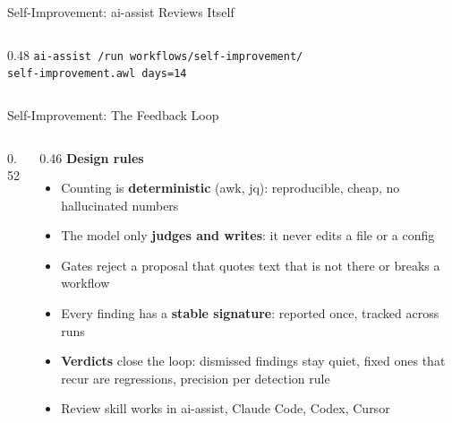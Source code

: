 \documentclass[aspectratio=169,10pt]{beamer}
\begin{document}
\begin{frame}[fragile]{Self-Improvement: ai-assist Reviews Itself}
\begin{columns}[T]
\begin{column}{0.48\textwidth}
\smallskip
{\scriptsize\texttt{ai-assist /run workflows/self-improvement/\\self-improvement.awl days=14}}
\end{column}
\end{columns}
\end{frame}

\begin{frame}[fragile]{Self-Improvement: The Feedback Loop}
\begin{columns}[T]
\begin{column}{0.52\textwidth}
\centering
{}
\end{column}
\begin{column}{0.46\textwidth}
\textbf{Design rules}
\begin{itemize}\scriptsize\setlength{\itemsep}{1pt}
  \item Counting is \textbf{deterministic} (awk, jq): reproducible, cheap, no hallucinated numbers
  \item The model only \textbf{judges and writes}: it never edits a file or a config
  \item Gates reject a proposal that quotes text that is not there or breaks a workflow
  \item Every finding has a \textbf{stable signature}: reported once, tracked across runs
  \item \textbf{Verdicts} close the loop: dismissed findings stay quiet, fixed ones that recur are \alert{regressions}, precision per detection rule
  \item Review skill works in ai-assist, Claude Code, Codex, Cursor
\end{itemize}
\end{column}
\end{columns}
\end{frame}
\end{document}
